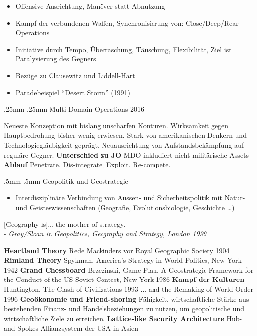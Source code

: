 {}\documentclass[a4paper,landscape,twoside]{article}
\makeatletter
\renewcommand{\section}{\@startsection{section}{1}{\z@}%
	{.5mm}%
	{.5mm}%
	{\normalfont\normalsize\bfseries}}
\renewcommand{\subsection}{\@startsection{subsection}{2}{\z@}%
	{.25mm}%
	{.25mm}%
	{\normalfont\small\bfseries}}
\renewenvironment{quote}
{\list{}{\rightmargin0mm\leftmargin0mm}
	\item\relax\centering\arraybackslash}
{\endlist\vspace{-1mm}} %
\makeatother
\begin{document}
\begin{multicols}{4}
	\begin{itemize}
		\item
		      Offensive Ausrichtung, Manöver statt Abnutzung
		\item
		      Kampf der verbundenen Waffen, Synchronisierung von: Close/Deep/Rear Operations
		\item
		      Initiative durch Tempo, Überraschung, Täuschung, Flexibilität,
		      Ziel ist Paralysierung des  Gegners
		\item
		      Bezüge zu Clausewitz und Liddell-Hart
		\item
		      Paradebeispiel ``Desert Storm'' (1991)
	\end{itemize}


	\subsection{Multi Domain Operations 2016}

	Neueste Konzeption mit bislang unscharfen Konturen.
	Wirksamkeit gegen Hauptbedrohung bisher wenig erwiesen.
	Stark von amerikanischen Denkern und Technologiegläubigkeit geprägt.
	Neuausrichtung von Aufstandsbekämpfung auf reguläre Gegner.
	\textbf{Unterschied zu JO}
	MDO inkludiert nicht-militärische Assets
	\textbf{Ablauf}
	Penetrate,
	Dis-integrate,
	Exploit,
	Re-compete.

	\section{Geopolitik und Geostrategie}

	\begin{itemize}
		\item
		      Interdisziplinäre Verbindung von Aussen- und
		      Sicherheitspolitik mit Natur- und Geisteswissenschaften
		      (Geografie, Evolutionsbiologie, Geschichte \ldots)
	\end{itemize}
	\begin{quote}
		{[}Geography is{]}... the mother of strategy.\\
		- \emph{Gray/Sloan in Geopolitics, Geography and Strategy,
			London 1999}
	\end{quote}

	\textbf{Heartland Theory}
	Rede Mackinders vor Royal Geographic Society 1904
	\textbf{Rimland Theory}
	Spykman, America's Strategy in World Politics, New York 1942
	\textbf{Grand Chessboard}
	Brzezinski, Game Plan. A Geostrategic Framework for
	the Conduct of the US-Soviet Contest, New York 1986
	\textbf{Kampf der Kulturen}
	Huntington, The Clash of Civilizations 1993 ... and the Remaking of World Order 1996
	\textbf{Geoökonomie und Friend-shoring}
	Fähigkeit, wirtschaftliche Stärke aus
	bestehenden Finanz- und Handelsbeziehungen zu nutzen, um geopolitische
	und wirtschaftliche Ziele zu erreichen.
	\textbf{Lattice-like Security Architecture}
	Hub-and-Spokes Allianzsystem der USA in Asien



\end{multicols}
\end{document}
